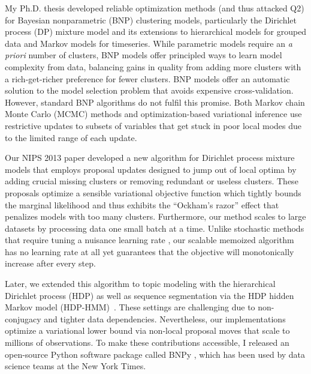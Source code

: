 \documentclass[11pt,letterpaper]{article}
\begin{document}
My Ph.D. thesis developed reliable optimization methods (and thus attacked Q2) for Bayesian nonparametric (BNP) clustering models, particularly the Dirichlet process (DP) mixture model and its extensions to hierarchical models for grouped data and Markov models for timeseries. 
While parametric models require an \emph{a priori} number of clusters,
BNP models offer principled ways to 
learn model complexity from data,
balancing gains in quality from adding more clusters with a rich-get-richer preference for fewer clusters.
BNP models offer an automatic solution to the model selection problem that avoids expensive cross-validation. 
However, standard BNP algorithms do not fulfil this promise. Both Markov chain Monte Carlo (MCMC) methods and optimization-based variational inference use restrictive updates to subsets of variables that get stuck in poor local modes due to the limited range of each update.

Our NIPS 2013 paper \cite{hughes2013moVB} developed a new algorithm for Dirichlet process mixture models that employs proposal updates designed to jump out of local optima by adding crucial missing clusters or removing redundant or useless clusters. 
These proposals optimize a sensible variational objective function which tightly bounds the marginal likelihood and thus exhibits the ``Ockham's razor'' effect that penalizes models with too many clusters.
Furthermore, our method scales to large datasets by processing data one small batch at a time. Unlike stochastic methods that require tuning a nuisance learning rate \cite{hoffman2013svi}, our scalable memoized algorithm has no learning rate at all yet guarantees that the objective will monotonically increase after every step.

Later, we extended this algorithm to topic modeling with the hierarchical Dirichlet process (HDP) \citep{hughes2015hdpreliable} as well as sequence segmentation via the HDP hidden Markov model (HDP-HMM)~\citep{hughes2015hdphmm}. 
These settings are challenging due to non-conjugacy and tighter data dependencies.
Nevertheless, our implementations optimize a variational lower bound via non-local proposal moves that scale to millions of observations.
To make these contributions accessible, I released an open-source Python software package called BNPy \citep{hughes2017bnpy}, which has been used by data science teams at the New York Times.
\end{document}
